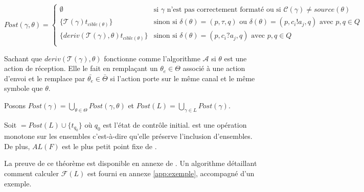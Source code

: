 $$
Post(\gamma,\theta) = \left\{ \begin{array}{ll}
    \emptyset & \text{si } \gamma \text{ n'est pas correctement formaté ou si } \mathcal{C}(\gamma)\neq source(\theta)\\
    \{\mathcal{T}(\gamma)t_{cible(\theta)}\} & \text{sinon si }\delta(\theta)=(p,\tau,q) \text{ ou } \delta(\theta)=(p,c_i!a_j,q) \text{ avec }p,q\in Q\\
    \{deriv(\mathcal{T}(\gamma),\theta)t_{cible(\theta)}\}& \text{sinon si } \delta(\theta)=(p,c_i?a_j,q) \text{ avec }p,q\in Q \\
    \end{array} \right.
$$

Sachant que $deriv(\mathcal{T}(\gamma),\theta)$ fonctionne comme l'algorithme $\mathcal{A}$ si $\theta$ est une action de réception. Elle le fait en remplaçant un $\theta_e \in \Theta$ associé à une action d'envoi et le remplace par $\bar{\theta_e} \in \bar{\Theta}$ si l'action porte sur le même canal et le même symbole que $\theta$.

Posons $Post(\gamma)=\bigcup_{\theta\in\Theta}Post(\gamma,\theta)$ et $Post(L)=\bigcup_{\gamma\in L}Post(\gamma)$.


\begin{theorem}\label{thm:fl}
  Soit \fl$=Post(L)\cup\{t_{q_0}\}$ où $q_0$ est l'état de contrôle initial. \fl est une opération monotone sur les ensembles c'est-à-dire qu'elle préserve l'inclusion d'ensembles. De plus, $AL(F)$ est le plus petit point fixe de \fl.
\end{theorem}

La preuve de ce théorème est disponible en annexe de \cite{Vardhan04}. Un algorithme détaillant comment calculer $\mathcal{F}(L)$ est fourni en annexe \ref{app:exemple}, accompagné d'un exemple.
